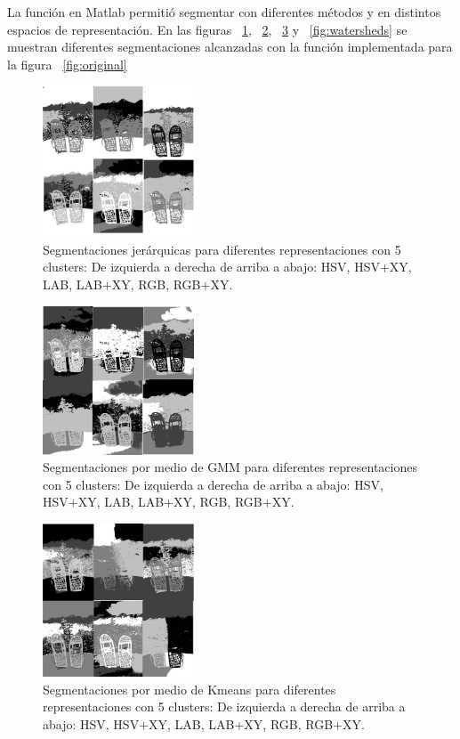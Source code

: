 \documentclass[10pt,twocolumn,letterpaper]{article}
\begin{document}
La función en Matlab permitió segmentar con diferentes métodos y en distintos espacios de representación. En las figuras ~\ref{fig:jerarquica}, ~\ref{fig:gmm}, ~\ref{fig:kmeans} y ~\ref{fig:watersheds} se muestran diferentes segmentaciones alcanzadas con la función implementada para la figura ~\ref{fig:original}


\begin{figure}[h]
    \centering
    \includegraphics[width=0.4\textwidth]{Jerarquica.jpg}
    \caption{Segmentaciones jerárquicas para diferentes representaciones con 5 clusters: De izquierda a derecha de arriba a abajo: HSV, HSV+XY, LAB, LAB+XY, RGB, RGB+XY.}
    \label{fig:jerarquica}
\end{figure}

\begin{figure}[h]
    \centering
    \includegraphics[width=0.4\textwidth]{Gmm.jpg}
    \caption{Segmentaciones por medio de GMM para diferentes representaciones con 5 clusters: De izquierda a derecha de arriba a abajo: HSV, HSV+XY, LAB, LAB+XY, RGB, RGB+XY.}
    \label{fig:gmm}
\end{figure}

\begin{figure}[h]
    \centering
    \includegraphics[width=0.4\textwidth]{Kmeans.jpg}
    \caption{Segmentaciones por medio de Kmeans para diferentes representaciones con 5 clusters: De izquierda a derecha de arriba a abajo: HSV, HSV+XY, LAB, LAB+XY, RGB, RGB+XY.}
    \label{fig:kmeans}
\end{figure}
\end{document}
